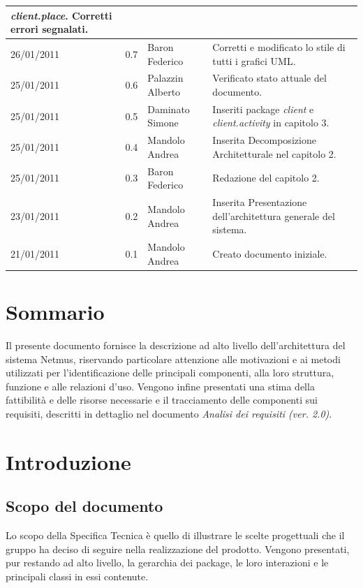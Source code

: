 \begin{longtable}{|p{}|c|p{}|p{}|}
\emph{client.place}. Corretti errori segnalati.\\
\hline
26/01/2011 & 0.7 & Baron Federico & Corretti e modificato lo stile di tutti i
grafici UML.\\
\hline
25/01/2011 & 0.6 & Palazzin Alberto & Verificato stato attuale del documento.\\
\hline
25/01/2011 & 0.5 & Daminato Simone & Inseriti package \emph{client} e
\emph{client.activity} in capitolo 3.\\
\hline
25/01/2011 & 0.4 & Mandolo Andrea & Inserita Decomposizione Architetturale nel
capitolo 2.\\
\hline
25/01/2011 & 0.3 & Baron Federico & Redazione del capitolo 2.\\
\hline
23/01/2011 & 0.2 & Mandolo Andrea & Inserita Presentazione dell'architettura
generale del sistema.\\
\hline
21/01/2011 & 0.1 & Mandolo Andrea & Creato documento iniziale.\\

\end{longtable}

\tableofcontents

\chapter*{Sommario}
Il presente documento fornisce la descrizione ad alto livello dell'architettura
del sistema Netmus, riservando particolare attenzione alle motivazioni e ai
metodi utilizzati per l'identificazione delle principali componenti, alla loro
struttura, funzione e alle relazioni d'uso. Vengono infine presentati una stima
della fattibilit\`a e delle risorse necessarie e il tracciamento delle
componenti sui requisiti, descritti in dettaglio nel documento
\emph{Analisi dei requisiti (ver. 2.0)}.


\thispagestyle{fancy} %

\chapter{Introduzione}
\thispagestyle{fancy} %

\section{Scopo del documento}
Lo scopo della Specifica Tecnica \`e quello di illustrare le scelte progettuali
che il gruppo ha deciso di seguire nella realizzazione del prodotto. Vengono
presentati, pur restando ad alto livello, la gerarchia dei package, le loro
interazioni e le principali classi in essi contenute.

